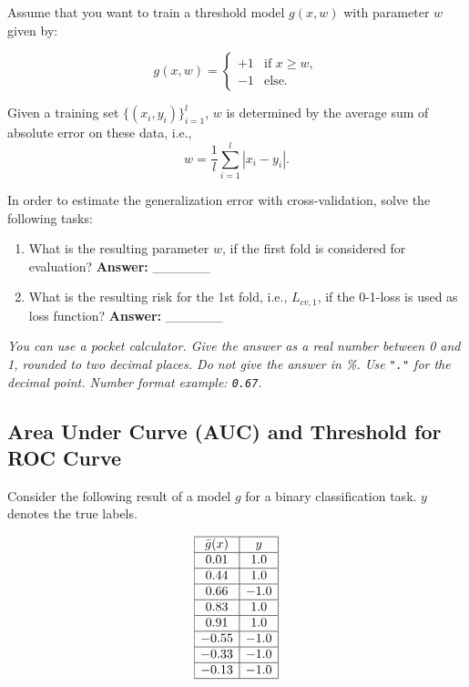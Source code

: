 \documentclass{article}
\begin{document}
Assume that you want to train a threshold model \( g(x, w) \) with parameter \( w \) given by:

\[
g(x, w) =
\begin{cases} 
+1 & \text{if } x \geq w, \\
-1 & \text{else}.
\end{cases}
\]

Given a training set \(\{(x_i, y_i)\}_{i=1}^l\), \( w \) is determined by the average sum of absolute error on these data, i.e.,
\[
w = \frac{1}{l} \sum_{i=1}^l |x_i - y_i|.
\]

In order to estimate the generalization error with cross-validation, solve the following tasks:
\begin{enumerate}
    \item What is the resulting parameter \( w \), if the first fold is considered for evaluation? \textbf{Answer:} \_\_\_\_\_\_
    \item What is the resulting risk for the 1st fold, i.e., \( L_{cv,1} \), if the 0-1-loss is used as loss function? \textbf{Answer:} \_\_\_\_\_\_
\end{enumerate}

\textit{You can use a pocket calculator. Give the answer as a real number between 0 and 1, rounded to two decimal places. Do not give the answer in \%. Use \texttt{"."} for the decimal point. Number format example: \texttt{0.67}.}



\subsection*{Area Under Curve (AUC) and Threshold for ROC Curve}

Consider the following result of a model \( g \) for a binary classification task. \( y \) denotes the true labels.

\[
\begin{array}{|c|c|}
\hline
\bar{g}(x) & y \\ \hline
0.01 & 1.0 \\ \hline
0.44 & 1.0 \\ \hline
0.66 & -1.0 \\ \hline
0.83 & 1.0 \\ \hline
0.91 & 1.0 \\ \hline
-0.55 & -1.0 \\ \hline
-0.33 & -1.0 \\ \hline
-0.13 & -1.0 \\ \hline
\end{array}
\]
\end{document}
